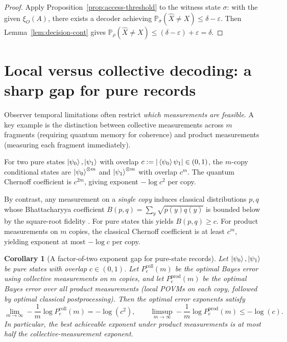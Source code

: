 \documentclass[11pt]{article}
\newcommand{\Prob}{\mathbb{P}}
\newcommand{\1}{\mathbf{1}}
\newcommand{\QCBdist}{\xi}
\theoremstyle{definition}
\theoremstyle{plain}
\newtheorem{corollary}{Corollary}
\begin{document}
\begin{proof}
Apply Proposition~\ref{prop:access-threshold} to the witness state $\sigma$: with the given $\QCBdist_O(A)$, there exists a decoder achieving
$\Prob_{\sigma}(\widehat{X}\neq X)\le \delta-\varepsilon$.
Then Lemma~\ref{lem:decision-cont} gives
$\Prob_{\rho}(\widehat{X}\neq X)\le (\delta-\varepsilon)+\varepsilon=\delta$.
\end{proof}

\section{Local versus collective decoding: a sharp gap for pure records}
\label{sec:local-vs-global}

Observer temporal limitations often restrict \emph{which measurements are feasible}.
A key example is the distinction between collective measurements across $m$ fragments (requiring quantum memory for coherence) and product measurements (measuring each fragment immediately).

For two pure states $\ket{\psi_0},\ket{\psi_1}$ with overlap $c:=|\braket{\psi_0}{\psi_1}|\in(0,1)$, the $m$-copy conditional states are $\ket{\psi_0}^{\otimes m}$ and $\ket{\psi_1}^{\otimes m}$ with overlap $c^m$.
The quantum Chernoff coefficient is $c^{2m}$, giving exponent $-\log c^2$ per copy.

By contrast, any measurement on a \emph{single copy} induces classical distributions $p,q$ whose Bhattacharyya coefficient $B(p,q)=\sum_y\sqrt{p(y)q(y)}$ is bounded below by the square-root fidelity \citep{FuchsCaves1994,Jozsa1994}.
For pure states this yields $B(p,q)\ge c$.
For product measurements on $m$ copies, the classical Chernoff coefficient is at least $c^m$, yielding exponent at most $-\log c$ per copy.

\begin{corollary}[A factor-of-two exponent gap for pure-state records]
\label{cor:factor-two-gap}
Let $\ket{\psi_0},\ket{\psi_1}$ be pure states with overlap $c\in(0,1)$.
Let $P^{\mathrm{coll}}_e(m)$ be the optimal Bayes error using \emph{collective} measurements on $m$ copies, and let $P^{\mathrm{prod}}_e(m)$ be the optimal Bayes error over all \emph{product} measurements (local POVMs on each copy, followed by optimal classical postprocessing).
Then the optimal error exponents satisfy
\[
\lim_{m\to\infty}-\frac1m\log P^{\mathrm{coll}}_e(m)= -\log(c^2),
\qquad
\limsup_{m\to\infty}-\frac1m\log P^{\mathrm{prod}}_e(m)\le -\log(c).
\]
In particular, the best achievable exponent under product measurements is at most half the collective-measurement exponent.
\end{corollary}
\end{document}
